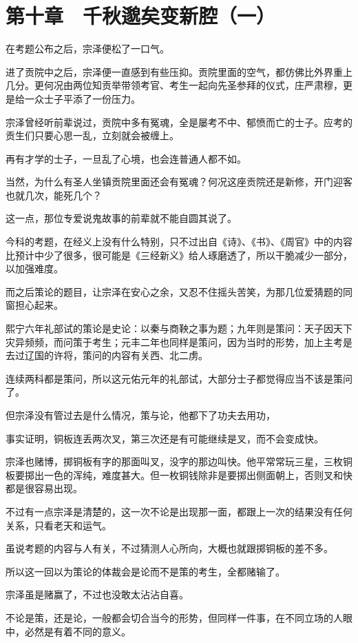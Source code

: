 \section{第十章　千秋邈矣变新腔（一）}

在考题公布之后，宗泽便松了一口气。

进了贡院中之后，宗泽便一直感到有些压抑。贡院里面的空气，都仿佛比外界重上几分。更何况由两位知贡举带领考官、考生一起向先圣参拜的仪式，庄严肃穆，更是给一众士子平添了一份压力。

宗泽曾经听前辈说过，贡院中多有冤魂，全是屡考不中、郁愤而亡的士子。应考的贡生们只要心思一乱，立刻就会被缠上。

再有才学的士子，一旦乱了心境，也会连普通人都不如。

当然，为什么有圣人坐镇贡院里面还会有冤魂？何况这座贡院还是新修，开门迎客也就几次，能死几个？

这一点，那位专爱说鬼故事的前辈就不能自圆其说了。

今科的考题，在经义上没有什么特别，只不过出自《诗》、《书》、《周官》中的内容比预计中少了很多，很可能是《三经新义》给人琢磨透了，所以干脆减少一部分，以加强难度。

而之后策论的题目，让宗泽在安心之余，又忍不住摇头苦笑，为那几位爱猜题的同窗担心起来。

熙宁六年礼部试的策论是史论：以秦与商鞅之事为题；九年则是策问：天子因天下灾异频频，而问策于考生；元丰二年也同样是策问，因为当时的形势，加上主考是去过辽国的许将，策问的内容有关西、北二虏。

连续两科都是策问，所以这元佑元年的礼部试，大部分士子都觉得应当不该是策问了。

但宗泽没有管过去是什么情况，策与论，他都下了功夫去用功，

事实证明，铜板连丢两次叉，第三次还是有可能继续是叉，而不会变成快。

宗泽也赌博，掷铜板有字的那面叫叉，没字的那边叫快。他平常常玩三星，三枚铜板要掷出一色的浑纯，难度甚大。但一枚铜钱除非是要掷出侧面朝上，否则叉和快都是很容易出现。

不过有一点宗泽是清楚的，这一次不论是出现那一面，都跟上一次的结果没有任何关系，只看老天和运气。

虽说考题的内容与人有关，不过猜测人心所向，大概也就跟掷铜板的差不多。

所以这一回以为策论的体裁会是论而不是策的考生，全都赌输了。

宗泽虽是赌赢了，不过也没敢太沾沾自喜。

不论是策，还是论，一般都会切合当今的形势，但同样一件事，在不同立场的人眼中，必然是有着不同的意义。


